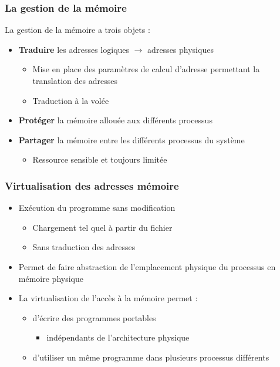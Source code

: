 \begin{frame}
\frametitle{La gestion de la mémoire}
La gestion de la mémoire a trois objets :
\begin{itemize}
\item <1> \textbf{Traduire} les adresses logiques $\rightarrow$ adresses physiques
\begin{itemize}
\item Mise en place des paramètres de calcul d'adresse permettant la translation des adresses
\item Traduction à la volée
\end{itemize}

\item <2> \textbf{Protéger} la mémoire allouée aux différents processus

\item <3> \textbf{Partager}  la mémoire entre les différents processus du système
\begin{itemize}
\item Ressource sensible et toujours limitée
\end{itemize}

\end{itemize}
\end{frame}

\begin{frame}
\frametitle{Virtualisation des adresses mémoire}
\begin{itemize}
\item <1>Exécution du programme sans modification
\begin{itemize}
\item Chargement tel quel à partir du fichier
\item Sans traduction des adresses
\end{itemize}

\item <2>Permet de faire abstraction de l’emplacement physique du processus en mémoire physique
\item <3>La virtualisation de l’accès à la mémoire permet :
\begin{itemize}
\item d’écrire des programmes portables
\begin{itemize}
\item indépendants de l’architecture physique
\end{itemize}

\item d'utiliser un même programme dans plusieurs processus différents
\end{itemize}
\end{itemize}
\end{frame}

